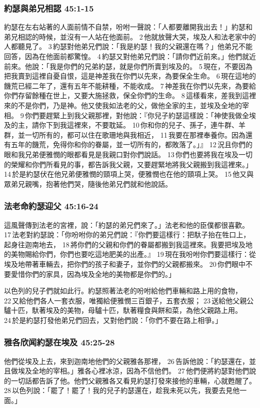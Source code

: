 \subsubsection{約瑟與弟兄相認 45:1-15}
約瑟在左右站著的人面前情不自禁，吩咐一聲說：「人都要離開我出去！」約瑟和弟兄相認的時候，並沒有一人站在他面前。 2 他就放聲大哭，埃及人和法老家中的人都聽見了。 3 約瑟對他弟兄們說：「我是約瑟！我的父親還在嗎？」他弟兄不能回答，因為在他面前都驚惶。 4 約瑟又對他弟兄們說：「請你們近前來。」他們就近前來。他說：「我是你們的兄弟約瑟，就是你們所賣到埃及的。 5 現在，不要因為把我賣到這裡自憂自恨，這是神差我在你們以先來，為要保全生命。 6 現在這地的饑荒已經二年了，還有五年不能耕種，不能收成。 7 神差我在你們以先來，為要給你們存留餘種在世上，又要大施拯救，保全你們的生命。 8 這樣看來，差我到這裡來的不是你們，乃是神。他又使我如法老的父，做他全家的主，並埃及全地的宰相。 9 你們要趕緊上到我父親那裡，對他說：『你兒子約瑟這樣說：「神使我做全埃及的主，請你下到我這裡來，不要耽延。 10 你和你的兒子、孫子，連牛群、羊群，並一切所有的，都可以住在歌珊地與我相近， 11 我要在那裡奉養你。因為還有五年的饑荒，免得你和你的眷屬，並一切所有的，都敗落了。」』 12 況且你們的眼和我兄弟便雅憫的眼都看見是我親口對你們說話。 13 你們也要將我在埃及一切的榮耀和你們所看見的事，都告訴我父親，又要趕緊地將我父親搬到我這裡來。」 14 於是約瑟伏在他兄弟便雅憫的頸項上哭，便雅憫也在他的頸項上哭。 15 他又與眾弟兄親嘴，抱著他們哭，隨後他弟兄們就和他說話。


\subsubsection{法老命約瑟迎父 45:16-24}
這風聲傳到法老的宮裡，說：「約瑟的弟兄們來了。」法老和他的臣僕都很喜歡。 17 法老對約瑟說：「你吩咐你的弟兄們說：『你們要這樣行：把馱子抬在牲口上，起身往迦南地去， 18 將你們的父親和你們的眷屬都搬到我這裡來。我要把埃及地的美物賜給你們，你們也要吃這地肥美的出產。』 19 現在我吩咐你們要這樣行：從埃及地帶著車輛去，把你們的孩子和妻子，並你們的父親都搬來。 20 你們眼中不要愛惜你們的家具，因為埃及全地的美物都是你們的。」

以色列的兒子們就如此行。約瑟照著法老的吩咐給他們車輛和路上用的食物， 22 又給他們各人一套衣服，唯獨給便雅憫三百銀子，五套衣服； 23 送給他父親公驢十匹，馱著埃及的美物，母驢十匹，馱著糧食與餅和菜，為他父親路上用。 24 於是約瑟打發他弟兄們回去，又對他們說：「你們不要在路上相爭。」

\subsubsection{雅各欣闻約瑟在埃及 45:25-28}
他們從埃及上去，來到迦南地他們的父親雅各那裡， 26 告訴他說：「約瑟還在，並且做埃及全地的宰相。」雅各心裡冰涼，因為不信他們。 27 他們便將約瑟對他們說的一切話都告訴了他。他們父親雅各又看見約瑟打發來接他的車輛，心就甦醒了。 28 以色列說：「罷了！罷了！我的兒子約瑟還在，趁我未死以先，我要去見他一面。」

